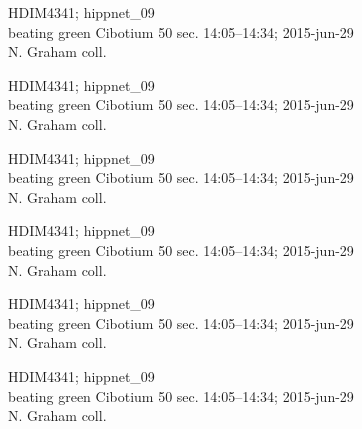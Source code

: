 \documentclass[2pt]{extarticle}
\begin{document}
\noindent
\parbox{0.16\textwidth}{\tiny \raggedright \rule[-0.3\baselineskip]{0pt}{10pt}HDIM4341; hippnet\_09\\ beating green Cibotium 50 sec. 14:05--14:34; 2015-jun-29\\ N. Graham coll.}
\parbox{0.16\textwidth}{\tiny \raggedright \rule[-0.3\baselineskip]{0pt}{10pt}HDIM4341; hippnet\_09\\ beating green Cibotium 50 sec. 14:05--14:34; 2015-jun-29\\ N. Graham coll.}
\parbox{0.16\textwidth}{\tiny \raggedright \rule[-0.3\baselineskip]{0pt}{10pt}HDIM4341; hippnet\_09\\ beating green Cibotium 50 sec. 14:05--14:34; 2015-jun-29\\ N. Graham coll.}
\parbox{0.16\textwidth}{\tiny \raggedright \rule[-0.3\baselineskip]{0pt}{10pt}HDIM4341; hippnet\_09\\ beating green Cibotium 50 sec. 14:05--14:34; 2015-jun-29\\ N. Graham coll.}
\parbox{0.16\textwidth}{\tiny \raggedright \rule[-0.3\baselineskip]{0pt}{10pt}HDIM4341; hippnet\_09\\ beating green Cibotium 50 sec. 14:05--14:34; 2015-jun-29\\ N. Graham coll.}
\parbox{0.16\textwidth}{\tiny \raggedright \rule[-0.3\baselineskip]{0pt}{10pt}HDIM4341; hippnet\_09\\ beating green Cibotium 50 sec. 14:05--14:34; 2015-jun-29\\ N. Graham coll.} \\ 
\vspace{0.001in} 
\end{document}
